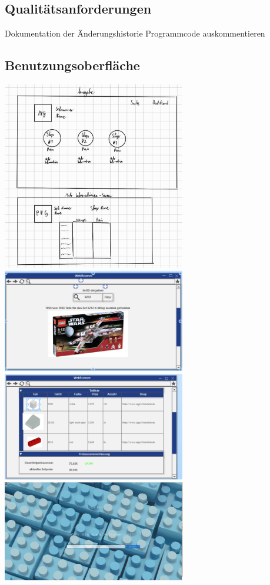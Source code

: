 \subsection{Qualitätsanforderungen}
Dokumentation der Änderungshistorie \newline
Programmcode auskommentieren \newline

\subsection{Benutzungsoberfläche}
\includegraphics[width=8cm]{pictures/skizzeausgabe.jpg} \newline \newline
\includegraphics[width=8cm]{pictures/programmvorschau1.png}
\includegraphics[width=8cm]{pictures/programmvorschau2.png} \newline \newline
\includegraphics[width=8cm]{pictures/programmvorschau3.png}

